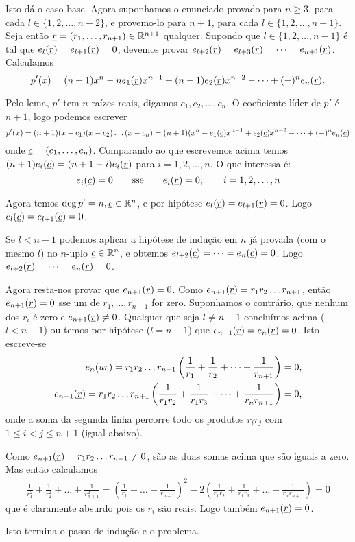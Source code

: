 \documentclass[main.tex]{subfiles}
\renewcommand*{\u}[1]{\ensuremath{\uline{#1}}}
\begin{document}
\begin{solution}
Isto dá o caso-base. Agora suponhamos o enunciado provado para $n\geq 3$,
para cada $l\in\{1,2,\dots,n-2\}$, e provemo-lo para $n+1$,
para cada $l\in\{1,2,\dots,n-1\}$.
Seja então $\u{r}=(r_1,\dots,r_{n+1})\in\mathbb{R}^{n+1}$ qualquer.
Supondo que $l\in\{1,2,\dots,n-1\}$ é tal que $e_l(\u{r})=e_{l+1}(\u{r})=0$,
devemos provar $e_{l+2}(\u{r})=e_{l+3}(\u{r})=\dots=e_{n+1}(\u{r})$.
Calculamos
\begin{equation*}
p'(x)=(n+1)x^n-ne_1(\u{r})x^{n-1}+(n-1)e_2(\u{r})x^{n-2}
-\dots+(-)^ne_n(\u{r}).
\end{equation*}

Pelo lema, $p'$ tem $n$ raízes reais, digamos $c_1,c_2,\dots,c_n$.
O coeficiente líder de $p'$ é $n+1$, logo podemos escrever
\begin{equation*}
p'(x)=(n+1)(x-c_1)(x-c_2)\dots(x-c_n)
=(n+1)(x^n-e_1(\u{c})x^{n-1}+e_2(\u{c})x^{n-2}-\dots+(-)^ne_n(\u{c})
\end{equation*}
onde $\u{c}=(c_1,\dots,c_n)$. Comparando ao que escrevemos acima temos
$(n+1)e_i(\u{c})=(n+1-i)e_i(\u{r})$ para $i=1,2,\dots,n$.
O que interessa é:
\begin{equation*}
e_i(\u{c})=0
\qquad \text{sse} \qquad
e_i(\u{r})=0,
\qquad i=1,2,\dots,n
\end{equation*}

Agora temos $\deg p'=n,\u{c}\in\mathbb{R}^n$, e por hipótese
$e_l(\u{r})=e_{l+1}(\u{r})=0$.
Logo $e_l(\u{c})=e_{l+1}(\u{c})=0$.

Se $l<n-1$ podemos aplicar a hipótese de indução em $n$ já provada
(com o mesmo $l$) no $n$-uplo $\u{c}\in\mathbb{R}^n$, e obtemos
$e_{l+2}(\u{c})=\dots=e_n(\u{c})=0$.
Logo $e_{l+2}(\u{r})=\dots=e_n(\u{r})=0$.

Agora resta-nos provar que $e_{n+1}(\u{r})=0$.
Como $e_{n+1}(\u{r})=r_1r_2\dots r_{n+1}$, então $e_{n+1}(\u{r})=0$
sse um de $r_1,\dots,r_{n+1}$ for zero.
Suponhamos o contrário, que nenhum dos $r_i$ é zero e
$e_{n+1}(\u{r})\neq 0$.
Qualquer que seja $l\neq n-1$ concluímos acima ($l<n-1$) ou temos
por hipótese ($l=n-1$) que $e_{n-1}(\u{r})=e_n(\u{r})=0$.
Isto escreve-se
\begin{align*}
e_n(u{r})=r_1r_2\dots r_{n+1}\left(\frac{1}{r_1}+\frac{1}{r_2}
+\dots+\frac{1}{r_{n+1}}\right)=0, \\
e_{n-1}(\u{r})=r_1r_2\dots r_{n+1}\left(\frac{1}{r_1r_2}+
\frac{1}{r_1r_3}+\dots+\frac{1}{r_nr_{n+1}}\right)=0,
\end{align*}
onde a soma da segunda linha percorre todo os produtos $r_ir_j$
com $1\leq i<j\leq n+1$ (igual abaixo).

Como $e_{n+1}(\u{r})=r_1r_2\dots r_{n+1}\neq 0$, são as duas
somas acima que são iguais a zero.
Mas então calculamos
\begin{align*}
\frac{1}{r_1^2}+\frac{1}{r_2^2}+\dots+\frac{1}{r_{n+1}^2}
=\left(\frac{1}{r_1}+\dots+\frac{1}{r_{n+1}}\right)^2
-2\left(\frac{1}{r_1r_2}+\frac{1}{r_1r_3}
+\dots+\frac{1}{r_nr_{n+1}}\right)=0
\end{align*}
que é claramente absurdo pois os $r_i$ são reais.
Logo também $e_{n+1}(\u{r})=0$.

Isto termina o passo de indução e o problema.
\end{solution}
\end{document}

